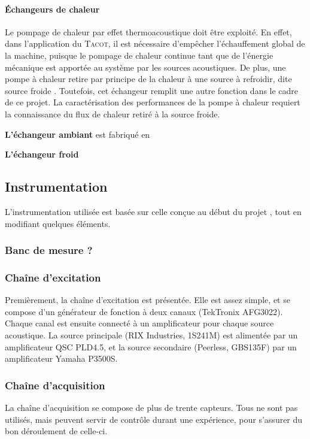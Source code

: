 \paragraph*{\'Echangeurs de chaleur}
Le pompage de chaleur par effet thermoacoustique doit être exploité. En effet, dans l'application du \textsc{Tacot}, il est nécessaire d'empêcher l'échauffement global de la machine, puisque le pompage de chaleur continue tant que de l'énergie mécanique est apportée au système par les sources acoustiques. De plus, une pompe à chaleur retire par principe de la chaleur à une source à refroidir, dite \og source froide \fg{}. Toutefois, cet échangeur remplit une autre fonction dans le cadre de ce projet. La caractérisation des performances de la pompe à chaleur requiert la connaissance du flux de chaleur retiré à la source froide.

\medskip


\noindent \textbf{L'échangeur ambiant} est fabriqué en 
\medskip

\noindent \textbf{L'échangeur froid}

\subsection{Instrumentation}
L'instrumentation utilisée est basée sur celle conçue au début du projet \cite{ramadan_design_2021}, tout en modifiant quelques éléments.


\subsubsection{Banc de mesure ?}

\subsubsection{Chaîne d'excitation}
Premièrement, la chaîne d'excitation est présentée. Elle est assez simple, et se compose d'un générateur de fonction à deux canaux (TekTronix AFG3022). Chaque canal est ensuite connecté à un amplificateur pour chaque source acoustique. La source principale (RIX Industries, 1S241M) est alimentée par un amplificateur QSC PLD4.5, et la source secondaire (Peerless, GBS135F) par un amplificateur Yamaha P3500S.\medskip


\subsubsection{Chaîne d'acquisition}
La chaîne d'acquisition se compose de plus de trente capteurs. Tous ne sont pas utilisés, mais peuvent servir de contrôle durant une expérience, pour s'assurer du bon déroulement de celle-ci.

